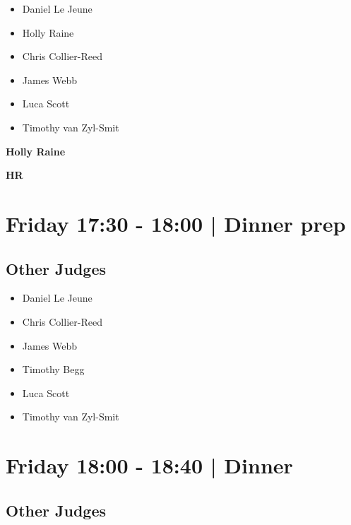 \documentclass[10pt, A5]{article}
\newcommand{\newtitle}[1]{\begin{center}{\Huge\bfseries #1 }\\ \vspace{5mm}\end{center}}
\newcommand{\newsubtitle}[1]{\begin{center}{\color{grey}\Large\bfseries #1 }\\ \vspace{5mm}\end{center}}
\begin{document}
            \begin{itemize}
                            \item Daniel Le Jeune
                            \item Holly Raine
                            \item Chris Collier-Reed
                            \item James Webb
                            \item Luca Scott
                            \item Timothy van Zyl-Smit
                        \end{itemize}
        

    
	\clearpage

		\newtitle{Holly Raine}
	\newsubtitle{HR}

            \section*{Friday 17:30
        -
        18:00
        |
         Dinner prep}
        
                
        \subsection*{Other Judges}
        
            \begin{itemize}
                            \item Daniel Le Jeune
                            \item Chris Collier-Reed
                            \item James Webb
                            \item Timothy Begg
                            \item Luca Scott
                            \item Timothy van Zyl-Smit
                        \end{itemize}
        

            \section*{Friday 18:00
        -
        18:40
        |
         Dinner }
        
                
        \subsection*{Other Judges}
        
\end{document}
